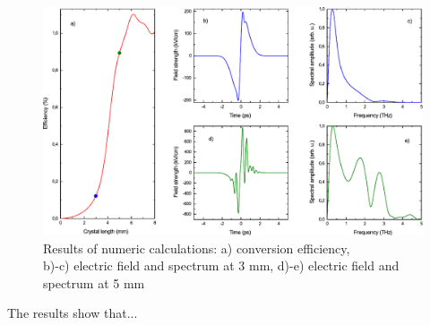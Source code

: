 \documentclass{article}
\begin{document}

\begin{figure}[H]\centering
\includegraphics[width=\textwidth]{graph1.pdf}
\caption{Results of numeric calculations: a) conversion efficiency, \\b)-c) electric field and spectrum at 3 mm, d)-e) electric field and spectrum at 5 mm}
\label{fig1}
\end{figure}


The results show that...
\begin{flushleft}
\printbibliography[title=\normalsize References]
\end{flushleft}
\end{document}
